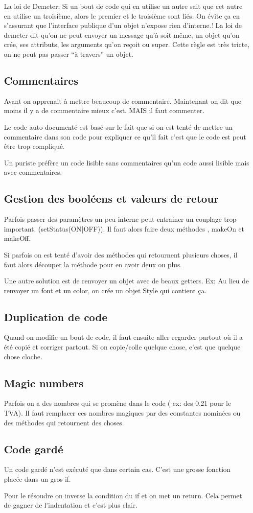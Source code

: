 La loi de Demeter: Si un bout de code qui en utilise un autre sait que cet autre en utilise un troisième, alors le premier et le troisième sont liés. On évite ça en s’assurant que l’interface publique d’un objet n’expose rien d’interne.!
La loi de demeter dit qu’on ne peut envoyer un message qu’à soit même, un objet qu’on crée, ses attributs, les arguments qu’on reçoit ou super. Cette règle est très tricte, on ne peut pas passer “à travers” un objet.
\subsection{Commentaires}
Avant on apprenait à mettre beaucoup de commentaire. Maintenant on dit que moins il y a de commentaire mieux c’est. MAIS il faut commenter.

Le code auto-documenté est basé sur le fait que si on est tenté de mettre un commentaire dans son code pour expliquer ce qu’il fait c’est que le code est peut être trop compliqué.

Un puriste préfère un code lisible sans commentaires qu’un code aussi lisible mais avec commentaires.
\subsection{Gestion des booléens et valeurs de retour}
Parfois passer des paramètres un peu interne peut entrainer un couplage trop important. (setStatus(ON|OFF)). Il faut alors faire deux méthodes , makeOn et makeOff.

Si parfois on est tenté d’avoir des méthodes qui retournent plusieurs choses, il faut alors découper la méthode pour en avoir deux ou plus.

Une autre solution est de renvoyer un objet avec de beaux getters. Ex: Au lieu de renvoyer un font et un color, on crée un objet Style qui contient ça.
\subsection{Duplication de code}
Quand on modifie un bout de code, il faut ensuite aller regarder partout où il a été copié et corriger partout. Si on copie/colle quelque chose, c’est que quelque chose cloche.
\subsection{Magic numbers}
Parfois on a des nombres qui se promène dans le code ( ex: des 0.21 pour le TVA).
Il faut remplacer ces nombres magiques par des constantes nominées ou des méthodes qui retournent des choses.
\subsection{Code gardé}
Un code gardé n’est exécuté que dans certain cas. C’est une grosse fonction placée dans un gros if.

Pour le résoudre on inverse la condition du if et on met un return.
Cela permet de gagner de l’indentation et c’est plus clair.
